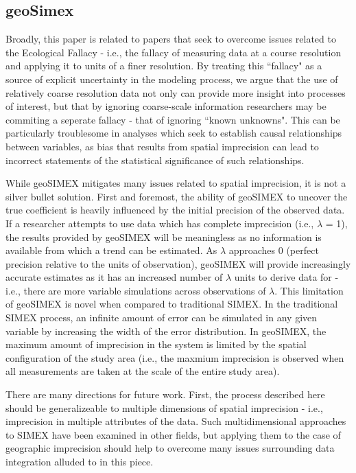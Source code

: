 \subsection{geoSimex}
Broadly, this paper is related to papers that seek to overcome issues related to the Ecological Fallacy - i.e., the fallacy of measuring data at a course resolution and applying it to units of a finer resolution.
By treating this ``fallacy" as a source of explicit uncertainty in the modeling process, we argue that the use of relatively coarse resolution data not only can provide more insight into processes of interest, but that by ignoring coarse-scale information researchers may be commiting a seperate fallacy - that of ignoring ``known unknowns".
This can be particularly troublesome in analyses which seek to establish causal relationships between variables, as bias that results from spatial imprecision can lead to incorrect statements of the statistical significance of such relationships.
\par
While geoSIMEX mitigates many issues related to spatial imprecision, it is not a silver bullet solution.
First and foremost, the ability of geoSIMEX to uncover the true coefficient is heavily influenced by the initial precision of the observed data.
If a researcher attempts to use data which has complete imprecision (i.e., $\lambda$ = 1), the results provided by geoSIMEX will be meaningless as no information is available from which a trend can be estimated.
As $\lambda$ approaches 0 (perfect precision relative to the units of observation), geoSIMEX will provide increasingly accurate estimates as it has an increased number of $\lambda$ units to derive data for - i.e., there are more variable simulations across observations of $\lambda$.
This limitation of geoSIMEX is novel when compared to traditional SIMEX.
In the traditional SIMEX process, an infinite amount of error can be simulated in any given variable by increasing the width of the error distribution.
In geoSIMEX, the maximum amount of imprecision in the system is limited by the spatial configuration of the study area (i.e., the maxmium imprecision is observed when all measurements are taken at the scale of the entire study area).
\par
There are many directions for future work.
First, the process described here should be generalizeable to multiple dimensions of spatial imprecision - i.e., imprecision in multiple attributes of the data.
Such multidimensional approaches to SIMEX have been examined in other fields, but applying them to the case of geographic imprecision should help to overcome many issues surrounding data integration alluded to in this piece.
